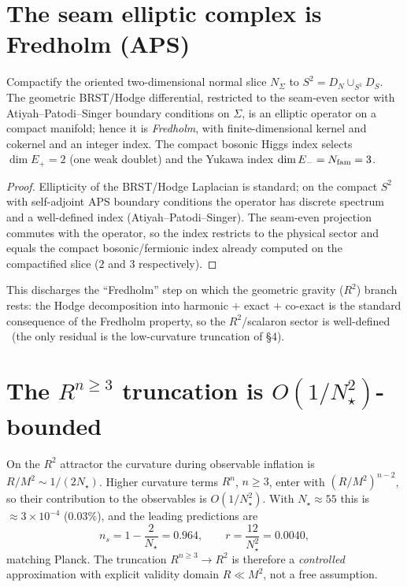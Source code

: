 \section{The seam elliptic complex is Fredholm (APS)}
\begin{lemma}
\label{lem:aps}
Compactify the oriented two-dimensional normal slice $N_\Sigma$ to $S^2=D_N\cup_{S^1}D_S$.
The geometric BRST/Hodge differential, restricted to the seam-even sector with Atiyah--Patodi--Singer
boundary conditions on $\Sigma$, is an elliptic operator on a compact manifold; hence it is
\emph{Fredholm}, with finite-dimensional kernel and cokernel and an integer index. The compact bosonic
Higgs index selects $\dim E_+=2$ (one weak doublet) and the Yukawa index $\dim E_-=N_{\mathrm{fam}}=3$.
\end{lemma}
\begin{proof}
Ellipticity of the BRST/Hodge Laplacian is standard; on the compact $S^2$ with self-adjoint APS
boundary conditions the operator has discrete spectrum and a well-defined index (Atiyah--Patodi--Singer).
The seam-even projection commutes with the operator, so the index restricts to the physical sector and
equals the compact bosonic/fermionic index already computed on the compactified slice ($2$ and $3$ respectively).
\end{proof}

\noindent This discharges the ``Fredholm'' step on which the geometric gravity ($R^2$) branch rests:
the Hodge decomposition into harmonic $+$ exact $+$ co-exact is the standard consequence of the Fredholm
property, so the $R^2$/scalaron sector is well-defined \mE\ (the only residual is the low-curvature
truncation of \S4).

\section{The $R^{n\ge3}$ truncation is $O(1/N_\star^2)$-bounded}
\begin{lemma}
\label{lem:trunc}
On the $R^2$ attractor the curvature during observable inflation is $R/M^2\sim 1/(2N_\star)$. Higher
curvature terms $R^{n}$, $n\ge3$, enter with $(R/M^2)^{n-2}$, so their contribution to the observables is
$O(1/N_\star^2)$. With $N_\star\approx55$ this is $\approx3\times10^{-4}$ ($0.03\%$), and the leading
predictions are
\[
  n_s=1-\frac2{N_\star}=0.964,\qquad r=\frac{12}{N_\star^2}=0.0040 ,
\]
matching Planck. The truncation $R^{n\ge3}\!\to\!R^2$ is therefore a \emph{controlled} approximation with
explicit validity domain $R\ll M^2$, not a free assumption.
\end{lemma}

